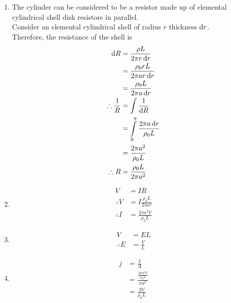 \documentclass[fleqn, a4paper, 12pt, twoside]{article}
\theoremstyle{definition}
\theoremstyle{theorem}
\begin{document}
\begin{solution}
	\begin{enumerate}[leftmargin = *]
		\item
			The cylinder can be considered to be a resistor made up of elemental cylindrical shell disk resistors in parallel.\\
			Consider an elemental cylindrical shell of radius $r$ thickness $\dif r$.\\
			Therefore, the resistance of the shell is
			\begin{align*}
				\dif R                 & = \frac{\rho L}{2 \pi r \dif r}                       \\
                                                       & = \frac{\rho_0 r L}{2 \pi a r \dif r}                 \\
                                                       & = \frac{\rho_0 L}{2 \pi a \dif r}                     \\
				\therefore \frac{1}{R} & = \int \frac{1}{\dif R}                               \\
                                                       & = \int\limits_{0}^{a} \frac{2 \pi a \dif r}{\rho_0 L} \\
                                                       & = \frac{2 \pi a^2}{\rho_0 L}                          \\
				\therefore R           & = \frac{\rho_0 L}{2 \pi a^2}
			\end{align*}
		\item
			\begin{align*}
				V            & = I R                          \\
				\therefore V & = I \frac{\rho_0 L}{2 \pi a^2} \\
				\therefore I & = \frac{2 \pi a^2 V}{\rho_0 L}
			\end{align*}
		\item
			\begin{align*}
				V            & = E L \\
				\therefore E & = \frac{V}{L}
			\end{align*}
		\item
			\begin{align*}
				j & = \frac{I}{A}                                  \\
                                  & = \frac{\frac{2 \pi a^2 V}{\rho_0 L}}{\pi a^2} \\
                                  & = \frac{2 V}{\rho_0 L}
			\end{align*}

\end{enumerate}
\end{solution}
\end{document}

